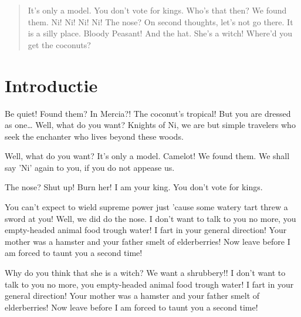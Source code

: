 \documentclass[a0,portrait]{a0poster}
\begin{document}
\begin{multicols}{2} %


\color{HoGentAccent1} %

\begin{abstract}
It's only a model.
You don't vote for kings. Who's that then? We found them. Ni! Ni! Ni! Ni!
The nose? On second thoughts, let's not go there. It is a silly place. Bloody Peasant! And the hat. She's a witch! Where'd you get the coconuts?
\end{abstract}

\color{HoGentAccent1} 
\section*{Introductie}
\color{black}
\color{black}
Be quiet! Found them? In Mercia?! The coconut's tropical! But you are dressed as one… Well, what do you want? Knights of Ni, we are but simple travelers who seek the enchanter who lives beyond these woods.

Well, what do you want? It's only a model. Camelot! We found them. We shall say 'Ni' again to you, if you do not appease us.

The nose? Shut up! Burn her! I am your king. You don't vote for kings.

You can't expect to wield supreme power just 'cause some watery tart threw a sword at you! Well, we did do the nose. I don't want to talk to you no more, you empty-headed animal food trough water! I fart in your general direction! Your mother was a hamster and your father smelt of elderberries! Now leave before I am forced to taunt you a second time!

Why do you think that she is a witch? We want a shrubbery!! I don't want to talk to you no more, you empty-headed animal food trough water! I fart in your general direction! Your mother was a hamster and your father smelt of elderberries! Now leave before I am forced to taunt you a second time!


\end{multicols}
\end{document}
